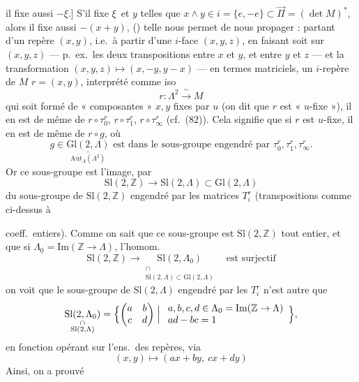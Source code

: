 \documentclass[11pt,a4paper]{article}
\begin{document}
il fixe aussi $-\xi$.] S'il fixe $\xi$\, et $y$ telles que $x\wedge y\in i=\{e,-e\}\subset\overrightarrow{\Pi}=(\det M)^{*}$, alors il fixe aussi  $-(x+y)$, () telle nous permet de nous propager : partant d'un repère $(x,y)$,  i.e.\ à partir d'une $i$-face $(x,y,z)$, en faisant soit   sur $(x,y,z)$ --- p.\ ex.\ les deux transpositions entre $x$ et $y$, et entre $y$ et $z$ --- et la transformation $(x,y,z)\longmapsto(x,-y,y-x)$ --- en termes matriciels, un $i$-repère de $M$ $r=(x,y)$, interprété comme iso
\[
r : \Lambda^2 \xrightarrow{\ \sim\ } M
\]
qui soit formé de « composantes » $x,y$ fixes par $u$ (on dit que $r$ est « $u$-fixe »), il en est de même de $r\circ\tau_0^{r}$, $r\circ\tau_1^{r}$, $r\circ\tau_\infty^{r}$ (cf.\ (82)). Cela signifie que si $r$ est $u$-fixe, il en est de même de $r\circ g$, où
\[
g\in\underset{\mathrm{Aut}_\Lambda(\Lambda^2)}{\underline{\mathrm{Gl}(2,\Lambda)}} \text{ est dans le sous-groupe engendré par } \tau_0^{r},\tau_1^{r},\tau_\infty^{r} .
\]
Or ce sous-groupe est l'image, par
\[
\mathrm{Sl}(2,\mathbb{Z}) \longrightarrow \mathrm{Sl}(2,\Lambda)\subset\mathrm{Gl}(2,\Lambda)
\]
du sous-groupe de $\mathrm{Sl}(2,\mathbb{Z})$ engendré par les matrices $T_i^{r}$ (transpositions comme ci-dessus à

coeff.\ entiers). Comme on sait que ce sous-groupe est $\mathrm{Sl}(2,\mathbb{Z})$ tout entier, et que si $\Lambda_0=\mathrm{Im}(\mathbb{Z}\to\Lambda)$, \struck{\ill{}} l'homom.
\[
\mathrm{Sl}(2,\mathbb{Z}) \longrightarrow \underset{\substack{\cap\\ \mathrm{Sl}(2,\Lambda)\subset\mathrm{Gl}(2,\Lambda)}}{\mathrm{Sl}(2,\Lambda_0)} \quad\text{est surjectif}
\]
on voit que le sous-groupe de $\mathrm{Sl}(2,\Lambda)$ engendré par les $T_i^{r}$ n'est autre que 
\[
\underset{\substack{\cap\\ \mathrm{Sl}(2,\Lambda)}}{\mathrm{Sl}(2,\Lambda_0)} = \Bigl\{\begin{pmatrix} a & b\\ c & d\end{pmatrix} \Bigm| \begin{array}{l} a,b,c,d\in\Lambda_0=\mathrm{Im}(\mathbb{Z}\to\Lambda)\\ ad-bc=1\end{array}\Bigr\},
\]
en fonction opérant   sur l'ens.\ des repères, via
\[
(x,y)\longmapsto(ax+by,\ cx+dy)
\]
Ainsi, on a prouvé
\end{document}
